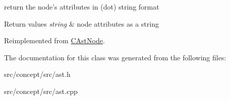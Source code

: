 return the node's attributes in (dot) string format 


\begin{DoxyRetVals}{Return values}
{\em string} & node attributes as a string \\
\hline
\end{DoxyRetVals}


Reimplemented from \hyperlink{classCAstNode_a9a30718a50f12845e03181846dab1432}{C\-Ast\-Node}.



The documentation for this class was generated from the following files\-:\begin{DoxyCompactItemize}
\item 
src/concept/src/ast.\-h\item 
src/concept/src/ast.\-cpp\end{DoxyCompactItemize}
